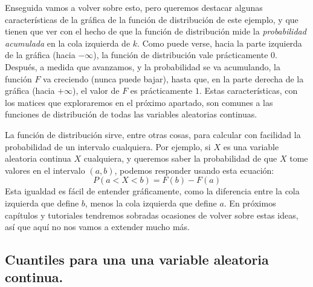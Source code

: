 Enseguida vamos a volver sobre esto, pero queremos destacar algunas características de la gráfica de la función de distribución de este ejemplo, y que tienen que ver con el hecho de que la función de distribución mide la {\em probabilidad acumulada} en la cola izquierda de $k$. Como puede verse, hacia la parte izquierda de la gráfica (hacia $-\infty$), la función de distribución vale prácticamente $0$. Después, a medida que avanzamos, y la probabilidad se va acumulando, la función $F$ va creciendo (nunca puede bajar), hasta que, en la parte derecha de la gráfica (hacia $+\infty$), el valor de $F$ es prácticamente $1$.  Estas características, con los matices que exploraremos en el próximo apartado, son comunes a las funciones de distribución de todas las variables aleatorias continuas.

La función de distribución sirve, entre otras cosas, para calcular con facilidad la probabilidad de un intervalo cualquiera. Por ejemplo, si $X$ es una variable aleatoria continua $X$ cualquiera, y queremos saber la probabilidad de que $X$ tome valores en el intervalo $(a,b)$, podemos responder usando esta ecuación:
\[P(a<X<b) = F(b) - F(a)\]
Esta igualdad es fácil de entender gráficamente, como la diferencia entre la cola izquierda que
define $b$, menos la cola izquierda que define $a$. En próximos capítulos y tutoriales tendremos
sobradas ocasiones de volver sobre estas ideas, así que aquí no nos vamos a extender mucho más.

\subsection{Cuantiles para una una variable aleatoria continua.}
\label{cap05:subsec:CuantilesVariableContinua}

